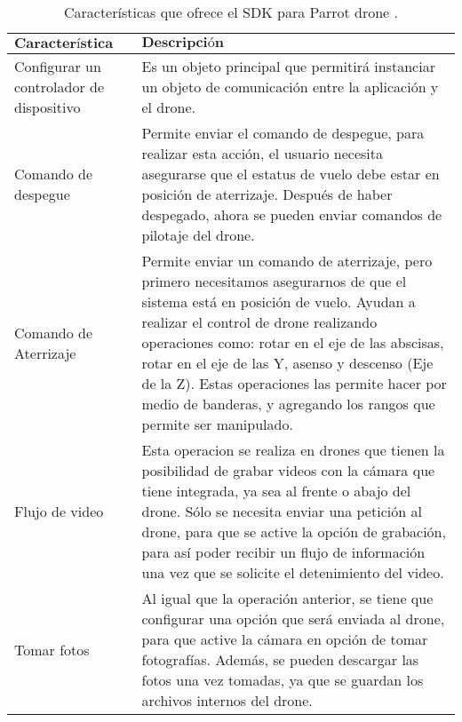 \begin{table}[H]
	\centering 
	\caption{Características que ofrece el SDK para Parrot drone 
		 \cite{sdk_program_drone}.}
	\begin{tabular*}{0.9\textwidth}{@{\extracolsep{\fill}} |l|l|}
		\hline
		$\textbf{Característica}$ & $\textbf{Descripción}$
		\\\hline
		\parbox[t]{3cm}{Configurar un controlador de dispositivo} & 
		\parbox[t]{10.2cm}{Es un objeto principal que permitirá 
		instanciar un objeto de comunicación entre la aplicación y el 
		drone.
		} \\
		\hline
		\parbox[t]{3cm}{Comando de despegue} & \parbox[t]{10.2cm}{
		Permite enviar el comando de despegue, para realizar esta 
		acción, el usuario necesita asegurarse que el estatus de vuelo 
		debe estar en posición de aterrizaje. Después de haber 
		despegado, ahora se pueden enviar comandos de pilotaje del 
		drone.
		} \\
		\hline
		\parbox[t]{3cm}{Comando de Aterrizaje} & \parbox[t]{10.2cm}{
		Permite enviar un comando de aterrizaje, pero primero 
		necesitamos asegurarnos de que el sistema está en posición de 
		vuelo. Ayudan a realizar el control de drone realizando 
		operaciones como: rotar en el eje de las abscisas, rotar en el 
		eje de las Y, asenso y descenso (Eje de la Z). Estas operaciones 
		las permite hacer por medio de banderas, y agregando los rangos 
		que permite ser manipulado.}  
		\\\hline
		\parbox[t]{3cm}{Flujo de video} & \parbox[t]{10.2cm}{Esta 
		operacion se realiza en drones que tienen la posibilidad de 
		grabar videos con la cámara que tiene integrada, ya sea al 
		frente o abajo del drone. Sólo se necesita enviar una petición 
		al drone, para que se active la opción de grabación, para así 
		poder recibir un flujo de información una vez que se solicite el 
		detenimiento del video.}
		\\\hline
		\parbox[t]{3cm}{Tomar fotos} & \parbox[t]{10.2cm}{Al igual que 
		la operación anterior, se tiene que configurar una opción que 
		será enviada al drone, para que active la cámara en opción de 
		tomar fotografías. Además, se pueden descargar las fotos una vez 
		tomadas, ya que se guardan los archivos internos del drone.}
		\\\hline
	\end{tabular*}
\end{table}

%
